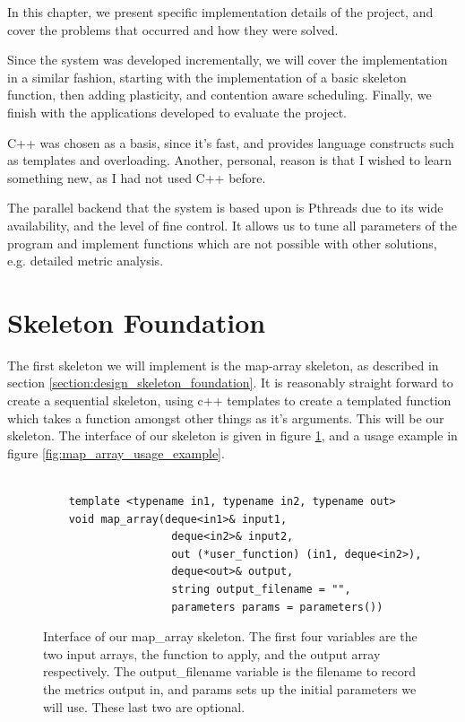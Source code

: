 
In this chapter, we present specific implementation details of the project, and cover the problems that occurred and how they were solved.

Since the system was developed incrementally, we will cover the implementation in a similar fashion, starting with the implementation of a basic skeleton function, then adding plasticity, and contention aware scheduling. Finally, we finish with the applications developed to evaluate the project.

C++ was chosen as a basis, since it's fast, and provides language constructs such as templates and overloading. Another, personal, reason is that I wished to learn something new, as I had not used C++ before. 

The parallel backend that the system is based upon is Pthreads due to its wide availability, and the level of fine control. It allows us to tune all parameters of the program and implement functions which are not possible with other solutions, e.g. detailed metric analysis. 



\section{Skeleton Foundation}
\label{section:implementation_skeleton_foundation}

The first skeleton we will implement is the map-array skeleton, as described in section \ref{section:design_skeleton_foundation}. It is reasonably straight forward to create a sequential skeleton, using c++ templates to create a templated function which takes a function amongst other things as it's arguments. This will be our skeleton. The interface of our skeleton is given in figure \ref{fig:map_array_interface}, and a usage example in figure \ref{fig:map_array_usage_example}.



\begin{figure}
	\begin{lstlisting}

	template <typename in1, typename in2, typename out>
	void map_array(deque<in1>& input1, 
				   	deque<in2>& input2, 
				   	out (*user_function) (in1, deque<in2>), 
				   	deque<out>& output, 
				   	string output_filename = "", 
				   	parameters params = parameters())

	\end{lstlisting}

	\caption{Interface of our map\_array skeleton. The first four variables are the two input arrays, the function to apply, and the output array respectively. The output\_filename variable is the filename to record the metrics output in, and params sets up the initial parameters we will use. These last two are optional.}
	\label{fig:map_array_interface}
\end{figure}



